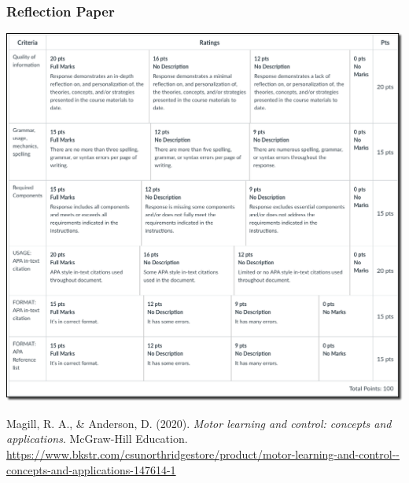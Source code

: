 \documentclass[
  letterpaper,
  DIV=11,
  numbers=noendperiod]{scrartcl}
\newlength{\cslhangindent}
\newlength{\cslentryspacingunit} %
\newenvironment{CSLReferences}[2] %
 {%
  \setlength{\parindent}{0pt}
  \ifodd #1
  \let\oldpar\par
  \def\par{\hangindent=\cslhangindent\oldpar}
  \fi
  \setlength{\parskip}{#2\cslentryspacingunit}
 }%
 {}
\begin{document}
\hypertarget{reflection-paper}{%
\subsubsection{Reflection Paper}\label{reflection-paper}}

\includegraphics{images/paste-3AE7E91C.png}

\hypertarget{refs}{}
\begin{CSLReferences}{1}{0}
\leavevmode{}%
Magill, R. A., \& Anderson, D. (2020). \emph{Motor learning and control:
concepts and applications}. McGraw-Hill Education.
\url{https://www.bkstr.com/csunorthridgestore/product/motor-learning-and-control--concepts-and-applications-147614-1}

\end{CSLReferences}
\end{document}

